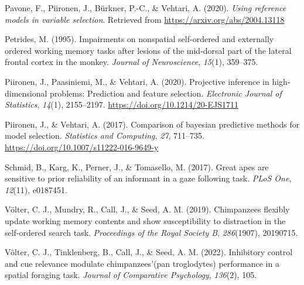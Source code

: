 \documentclass[
  man,floatsintext]{apa6}
\newlength{\cslhangindent}
\newlength{\cslentryspacingunit} %
\newenvironment{CSLReferences}[2] %
 {%
  \setlength{\parindent}{0pt}
  \ifodd #1
  \let\oldpar\par
  \def\par{\hangindent=\cslhangindent\oldpar}
  \fi
  \setlength{\parskip}{#2\cslentryspacingunit}
 }%
 {}
\begin{document}
\begin{CSLReferences}{1}{0}
\leavevmode{}%
Pavone, F., Piironen, J., Bürkner, P.-C., \& Vehtari, A. (2020). \emph{Using reference models in variable selection}. Retrieved from \url{https://arxiv.org/abs/2004.13118}

\leavevmode{}%
Petrides, M. (1995). Impairments on nonspatial self-ordered and externally ordered working memory tasks after lesions of the mid-dorsal part of the lateral frontal cortex in the monkey. \emph{Journal of Neuroscience}, \emph{15}(1), 359--375.

\leavevmode{}%
Piironen, J., Paasiniemi, M., \& Vehtari, A. (2020). {Projective inference in high-dimensional problems: Prediction and feature selection}. \emph{Electronic Journal of Statistics}, \emph{14}(1), 2155--2197. \url{https://doi.org/10.1214/20-EJS1711}

\leavevmode{}%
Piironen, J., \& Vehtari, A. (2017). Comparison of bayesian predictive methods for model selection. \emph{Statistics and Computing}, \emph{27}, 711--735. \url{https://doi.org/10.1007/s11222-016-9649-y}

\leavevmode{}%
Schmid, B., Karg, K., Perner, J., \& Tomasello, M. (2017). Great apes are sensitive to prior reliability of an informant in a gaze following task. \emph{PLoS One}, \emph{12}(11), e0187451.

\leavevmode{}%
Völter, C. J., Mundry, R., Call, J., \& Seed, A. M. (2019). Chimpanzees flexibly update working memory contents and show susceptibility to distraction in the self-ordered search task. \emph{Proceedings of the Royal Society B}, \emph{286}(1907), 20190715.

\leavevmode{}%
Völter, C. J., Tinklenberg, B., Call, J., \& Seed, A. M. (2022). Inhibitory control and cue relevance modulate chimpanzees'(pan troglodytes) performance in a spatial foraging task. \emph{Journal of Comparative Psychology}, \emph{136}(2), 105.

\end{CSLReferences}
\end{document}

